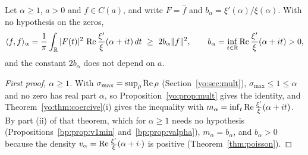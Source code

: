 \begin{table}[htbp]
\centering\small
{}
\caption{The comb constant $A_a(\alpha)$ of \eqref{zh:eq:Aa} and the barrier height $T_1(\alpha,a)=2\pi e^{A_a(\alpha)}$ at three basepoints. The column $\alpha=\frac12$ is Zhu's \cite{Zhu26}, who prints $A_{0.8}(\frac12)=2.9420$ and $T_1=119$ at $a=0.8$, $1.0\times10^7$ at $a=1.6$ and $2.4\times10^{11}$ at $a=2$; the digits here are $2.94197$, $119$, $1.04\times10^7$ and $2.44\times10^{11}$. For $\alpha>1$ the constant is bounded by $-2\zeta'(\alpha)/\zeta(\alpha)=18.88$, $3.01$, $1.14$ at $\alpha=1.1$, $1.5$, $2$.}
\label{zh:tab:comb}
\end{table}

\begin{corollary}\label{zh:prop:fullsymbol}
Let $\alpha\ge1$, $a>0$ and $f\in C(a)$, and write $F=\widehat f$ and $b_\alpha=\xi'(\alpha)/\xi(\alpha)$. With no hypothesis on the zeros,
\[
\langle f,f\rangle_\alpha=\frac1\pi\int_{\R}|F(t)|^2\,\re\frac{\xi'}{\xi}(\alpha+it)\,dt\ \ge\ 2b_\alpha\|f\|^2,\qquad b_\alpha=\inf_{t\in\R}\re\frac{\xi'}{\xi}(\alpha+it)>0,
\]
and the constant $2b_\alpha$ does not depend on $a$.
\end{corollary}

\begin{proof}[First proof, $\alpha\ge1$]
With $\sigma_{\max}=\sup_\rho\operatorname{Re}\rho$ (Section~\ref{yo:sec:mult}), $\sigma_{\max}\le1\le\alpha$ and no zero has real part $\alpha$, so Proposition~\ref{yo:prop:mult} gives the identity, and Theorem~\ref{yo:thm:coercive}(i) gives the inequality with $m_\alpha=\inf_t\operatorname{Re}\frac{\xi'}\xi(\alpha+it)$. By part (ii) of that theorem, which for $\alpha\ge1$ needs no hypothesis (Propositions~\ref{bp:prop:v1min} and~\ref{bp:prop:valpha}), $m_\alpha=b_\alpha$, and $b_\alpha>0$ because the density $v_\alpha=\operatorname{Re}\frac{\xi'}\xi(\alpha+i\cdot)$ is positive (Theorem~\ref{thm:poisson}).
\end{proof}

